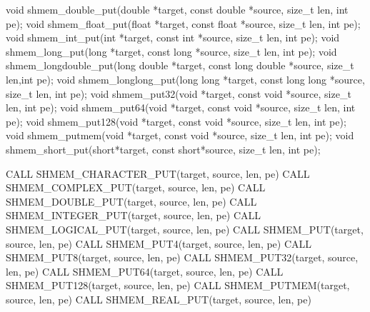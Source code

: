 \synC   %

void shmem_double_put(double *target, const double *source, size_t len, int pe);
void shmem_float_put(float *target, const float *source, size_t len, int pe);
void shmem_int_put(int *target, const int *source, size_t len, int pe);
void shmem_long_put(long *target, const long *source, size_t len, int pe);
void shmem_longdouble_put(long double *target, const long double *source, size_t len,int pe);
void shmem_longlong_put(long long *target, const long long *source, size_t len, int pe);
void shmem_put32(void *target, const void *source, size_t len, int pe);
void shmem_put64(void *target, const void *source, size_t len, int pe);
void shmem_put128(void *target, const void *source, size_t len, int pe);
void shmem_putmem(void *target, const void *source, size_t len, int pe);
void shmem_short_put(short*target, const short*source, size_t len, int pe); %

\synF   %

CALL SHMEM_CHARACTER_PUT(target, source, len, pe)
CALL SHMEM_COMPLEX_PUT(target, source, len, pe)
CALL SHMEM_DOUBLE_PUT(target, source, len, pe)
CALL SHMEM_INTEGER_PUT(target, source, len, pe)
CALL SHMEM_LOGICAL_PUT(target, source, len, pe)
CALL SHMEM_PUT(target, source, len, pe)
CALL SHMEM_PUT4(target, source, len, pe)
CALL SHMEM_PUT8(target, source, len, pe)
CALL SHMEM_PUT32(target, source, len, pe)
CALL SHMEM_PUT64(target, source, len, pe)
CALL SHMEM_PUT128(target, source, len, pe)
CALL SHMEM_PUTMEM(target, source, len, pe)
CALL SHMEM_REAL_PUT(target, source, len, pe) %


